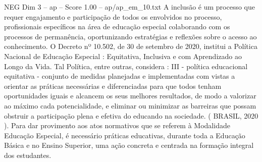 \begin{textsample}{NEG Dim 3 – ap – Score 1.00 – ap/ap\_em\_10.txt}
A inclusão é um processo que requer engajamento e participação de todos os envolvidos no processo, profissionais específicos na área de educação especial colaborando com os processos de permanência, oportunizando estratégias e reflexões sobre o acesso ao conhecimento.
O Decreto nº 10.502, de 30 de setembro de 2020, institui a Política Nacional de Educação Especial : Equitativa, Inclusiva e com Aprendizado ao Longo da Vida.
Tal Política, entre outras, considera : III - política educacional equitativa - conjunto de medidas planejadas e implementadas com vistas a orientar as práticas necessárias e diferenciadas para que todos tenham oportunidades iguais e alcancem os seus melhores resultados, de modo a valorizar ao máximo cada potencialidade, e eliminar ou minimizar as barreiras que possam obstruir a participação plena e efetiva do educando na sociedade. ( BRASIL, 2020 ).
Para dar provimento aos atos normativos que se referem à Modalidade Educação Especial, é necessário práticas educativas, durante toda a Educação Básica e no Ensino Superior, uma ação concreta e centrada na formação integral dos estudantes.

\end{textsample}
